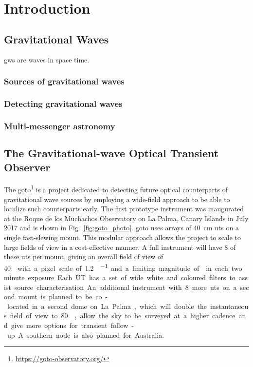 \chapter{Introduction}
\label{chap:intro}
\chaptoc{}

\newpage
\section{Gravitational Waves}
\label{sec:gw}

\glspl{gw} are waves in space time.

\lipsum{}


\subsection{Sources of gravitational waves}
\label{sec:gw_sources}

\lipsum{}


\subsection{Detecting gravitational waves}
\label{sec:gw_detecting}

\lipsum{}

\subsection{Multi-messenger astronomy}
\label{sec:multimessenger}

\lipsum{}


\newpage
\section{The Gravitational-wave Optical Transient Observer}
\label{sec:goto}

The \gls{goto}\footnote{\url{https://goto-observatory.org/}} is a project dedicated to detecting future optical counterparts of gravitational wave sources by employing a wide-field approach to be able to localize such counterparts early. The first prototype instrument was inaugurated at the Roque de los Muchachos Observatory on La Palma, Canary Islands in July 2017 and is shown in Fig.~\ref{fig:goto_photo}. \gls{goto} uses arrays of \SI{40}{\cm} \glspl{ut} on a single fast-slewing mount. This modular approach allows the project to scale to large fields of view in a cost-effective manner. A full instrument will have 8 of these \glspl{ut} per mount, giving an overall field of view of \SI{40}{\square\deg} with a pixel scale of \SI[per-mode=symbol]{1.2}{\arcsec\per\pixel} and a limiting magnitude of  in each two minute exposure. Each UT has a set of wide white and coloured filters to assist source characterisation.  An additional instrument with 8 more \glspl{ut} on a second mount is planned to be co-located in a second dome on La Palma, which will double the instantaneous field of view to \SI{80}{\square\deg}, allow the sky to be surveyed at a higher cadence and give more options for transient follow-up. A southern node is also planned for Australia.

